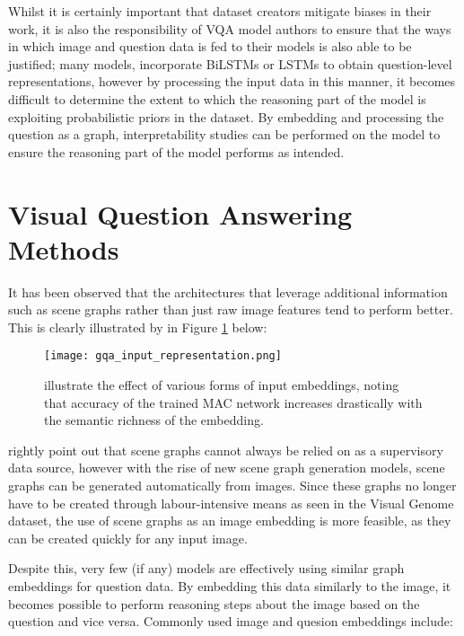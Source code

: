 Whilst it is certainly important that dataset creators mitigate biases in their work, it is also the responsibility of VQA model authors to ensure that the ways in which image and question data is fed to their models is also able to be justified; many models,  incorporate BiLSTMs \cite{hudson2018compositional} or LSTMs \cite{andreas2016neural} to obtain question-level representations, however by processing the input data in this manner, it becomes difficult to determine the extent to which the reasoning part of the model is exploiting probabilistic priors in the dataset. By embedding and processing the question as a graph, interpretability studies can be performed on the model to ensure the reasoning part of the model performs as intended.

\section{Visual Question Answering Methods}
\label{section:vqa_methods}

It has been observed that the architectures that leverage additional information such as scene graphs rather than just raw image features tend to perform better. This is clearly illustrated by \citeauthor{hudson2019gqa_preprint} in Figure \ref{fig:gqa_input_representation} below:

\begin{figure}[H]
    \centering
    \texttt{[image: gqa\_input\_representation.png]}
    \caption{\citeauthor{hudson2019gqa_preprint} illustrate the effect of various forms of input embeddings, noting that accuracy of the trained MAC network \cite{hudson2018compositional} increases drastically with the semantic richness of the embedding.}
    \label{fig:gqa_input_representation}
\end{figure}

\citeauthor{hudson2018compositional} rightly point out that scene graphs cannot always be relied on as a supervisory data source, however with the rise of new scene graph generation models, scene graphs can be generated automatically from images. Since these graphs no longer have to be created through labour-intensive means as seen in the Visual Genome dataset, the use of scene graphs as an image embedding is more feasible, as they can be created quickly for any input image.

\vspace{\baselineskip}

Despite this, very few (if any) models are effectively using similar graph embeddings for question data. By embedding this data similarly to the image, it becomes possible to perform reasoning steps about the image based on the question and vice versa. Commonly used image and quesion embeddings include:

